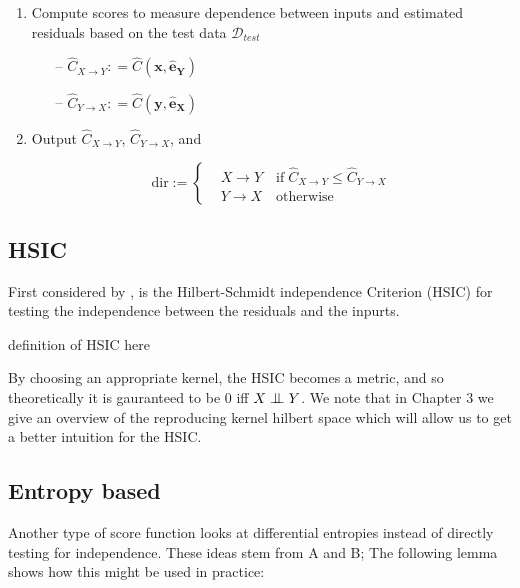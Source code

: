 \begin{algorithm}[H]
\begin{enumerate}
        \item Compute scores to measure dependence between inputs and estimated residuals based on the
        test data $\mathcal{D}_{test}$
        \begin{itemize}
            \item[--] $\hat{C}_{X \rightarrow Y}: = \hat{C}(\mathbf{x}, \mathbf{\hat{e}_Y})$ 
            \item[--] $\hat{C}_{Y \rightarrow X}: = \hat{C}(\mathbf{y}, \mathbf{\hat{e}_X})$
        \end{itemize}        

        \item Output $\hat{C}_{X \rightarrow Y}$, $\hat{C}_{Y \rightarrow X}$, and
        
        \[ 
        \text{dir} :=  
         \begin{cases} 
            & X \rightarrow Y \quad \text{if} \; \hat{C}_{X \rightarrow Y} \leq \hat{C}_{Y \rightarrow X}\\
            & Y \rightarrow X \quad \text{otherwise}
         \end{cases}
        \]
        
    \end{enumerate}

  \label{alg:anm_general}
  \end{algorithm}


\subsection{HSIC}

First considered by \cite{hoyer2009nonlinear}, is the Hilbert-Schmidt independence Criterion (HSIC) for
testing the independence between the residuals and the inpurts. 

definition of HSIC here

By choosing an appropriate kernel, the HSIC becomes a metric, and so theoretically it is gauranteed to 
be 0 iff $X \bigCI Y$. We note that in Chapter 3 we give an overview of the reproducing kernel hilbert 
space which will allow us to get a better intuition for the HSIC. 

\subsection{Entropy based}

Another type of score function looks at differential entropies instead of directly testing for independence.
These ideas stem from A and B; The following lemma shows how this might be used in practice:


